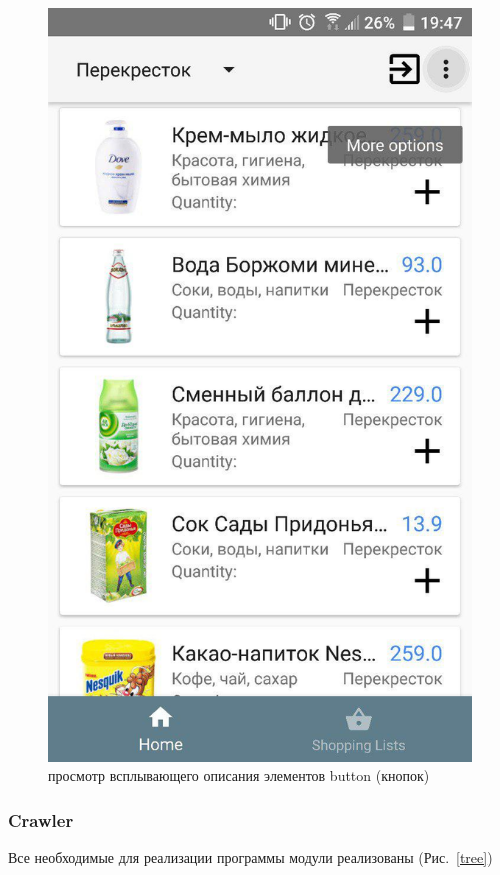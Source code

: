 \begin{figure}[h!]
    \includegraphics[height=0.38\textheight]{./screenshots/3/hint.jpg}
    \caption{\small{просмотр всплывающего описания элементов button (кнопок)}}
    \endminipage{}
\end{figure}

\subsubsection{Crawler}
Все необходимые для реализации программы модули реализованы (Рис.~\ref{tree})

